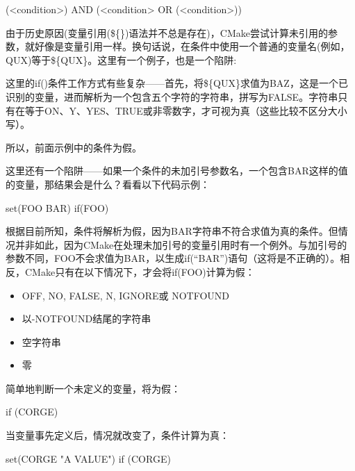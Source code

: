 \begin{shell}
(<condition>) AND (<condition> OR (<condition>))
\end{shell}


由于历史原因(变量引用(\$\{\})语法并不总是存在)，CMake尝试计算未引用的参数，就好像是变量引用一样。换句话说，在条件中使用一个普通的变量名(例如，QUX)等于\$\{QUX\}。这里有一个例子，也是一个陷阱:


这里的if()条件工作方式有些复杂——首先，将\$\{QUX\}求值为BAZ，这是一个已识别的变量，进而解析为一个包含五个字符的字符串，拼写为FALSE。字符串只有在等于ON、Y、YES、TRUE或非零数字，才可视为真（这些比较不区分大小写）。

所以，前面示例中的条件为假。

这里还有一个陷阱——如果一个条件的未加引号参数名，一个包含BAR这样的值的变量，那结果会是什么？看看以下代码示例：

\begin{cmake}
set(FOO BAR)
if(FOO)
\end{cmake}

根据目前所知，条件将解析为假，因为BAR字符串不符合求值为真的条件。但情况并非如此，因为CMake在处理未加引号的变量引用时有一个例外。与加引号的参数不同，FOO不会求值为BAR，以生成if(“BAR”)语句（这将是不正确的）。相反，CMake只有在以下情况下，才会将if(FOO)计算为假：

\begin{itemize}
\item
OFF, NO, FALSE, N, IGNORE或 NOTFOUND

\item
以-NOTFOUND结尾的字符串

\item
空字符串

\item
零
\end{itemize}

简单地判断一个未定义的变量，将为假：

\begin{cmake}
if (CORGE)
\end{cmake}

当变量事先定义后，情况就改变了，条件计算为真：

\begin{cmake}
set(CORGE "A VALUE")
if (CORGE)
\end{cmake}

